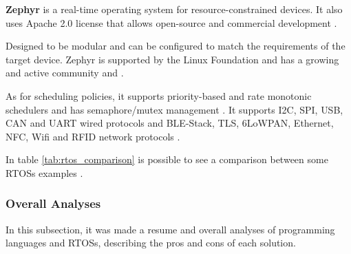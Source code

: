\textbf{Zephyr} is a real-time operating system for resource-constrained devices.
It also uses Apache 2.0 license that allows open-source and commercial development \cite{zephyr}.

Designed to be modular and can be configured to match the requirements of the target device.
Zephyr is supported by the Linux Foundation and has a growing and active community \cite{zephyr} and \cite{RTOS5}.

As for scheduling policies, it supports priority-based and rate monotonic schedulers and has semaphore/mutex management \cite{compRTOS}.
It supports \gls{I2C}, \gls{SPI}, \gls{USB}, \gls{CAN} and \gls{UART} wired protocols and \gls{BLE}-Stack, \gls{TLS}, 6LoWPAN, Ethernet, \gls{NFC}, \gls{Wifi} and \gls{RFID} network protocols \cite{compRTOS} \cite{compRTOS}.

In table \ref{tab:rtos_comparison} is possible to see a comparison between some \glspl{RTOS} examples \cite{compRTOS}.
\begin{table}[H]
    \centering
    \caption{Comparison of Real-Time Operating Systems}
    \label{tab:rtos_comparison}
\end{table}


\subsubsection{Overall Analyses}
In this subsection, it was made a resume and overall analyses of programming languages and \glspl{RTOS}, describing the pros and cons of each solution.


